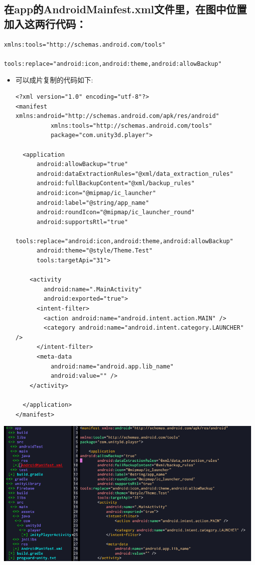 \documentclass[9pt, b5paper]{article}
\begin{document}
\subsection{在app的AndroidMainfest.xml文件里，在图中位置加入这两行代码：}
\label{sec-4-2}
\begin{verbatim}
xmlns:tools="http://schemas.android.com/tools"

tools:replace="android:icon,android:theme,android:allowBackup"
\end{verbatim}
\begin{itemize}
\item 可以成片复制的代码如下:
\begin{verbatim}
<?xml version="1.0" encoding="utf-8"?>
<manifest xmlns:android="http://schemas.android.com/apk/res/android"
          xmlns:tools="http://schemas.android.com/tools"
          package="com.unity3d.player">

  <application
      android:allowBackup="true"
      android:dataExtractionRules="@xml/data_extraction_rules"
      android:fullBackupContent="@xml/backup_rules"
      android:icon="@mipmap/ic_launcher"
      android:label="@string/app_name"
      android:roundIcon="@mipmap/ic_launcher_round"
      android:supportsRtl="true"
      tools:replace="android:icon,android:theme,android:allowBackup"
      android:theme="@style/Theme.Test"
      tools:targetApi="31">

    <activity
        android:name=".MainActivity"
        android:exported="true">
      <intent-filter>
        <action android:name="android.intent.action.MAIN" />
        <category android:name="android.intent.category.LAUNCHER" />
      </intent-filter>
      <meta-data
          android:name="android.app.lib_name"
          android:value="" />
    </activity>

  </application>
</manifest>
\end{verbatim}
\end{itemize}

\includegraphics[width=.9\linewidth]{./pic/unityToAndroid_20221123_223757.png}
\end{document}
